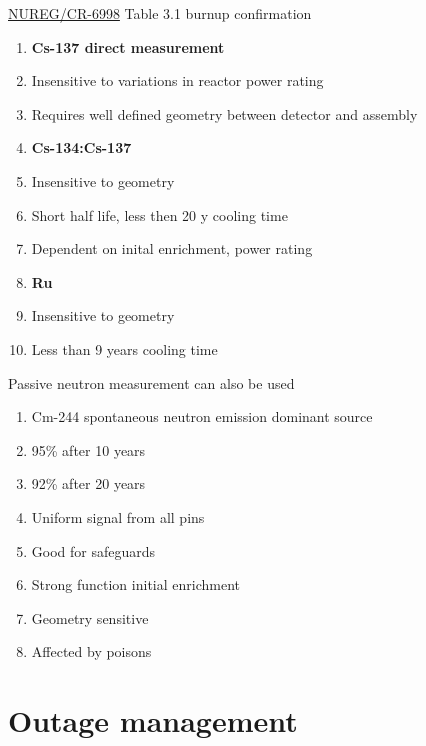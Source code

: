 \documentclass[aspectratio=1610,pdftex,dvipsnames,compress,xcolor={dvipsnames}]{beamer}
\begin{document}
\begin{frame}{\href{https://www.nrc.gov/docs/ML1002/ML100210543.pdf}{NUREG/CR-6998} Table 3.1 burnup confirmation}
    \begin{enumerate}[series=outerlist,topsep=0pt,itemsep=5pt,leftmargin=*,label=(\arabic*)]
        \item[]\textbf{Cs-137 direct measurement}
        \item[]Insensitive to variations in reactor power rating 
        \item[]Requires well defined geometry between detector and assembly
            \vspace{0.10in}
        \item[]\textbf{Cs-134:Cs-137}
        \item[]Insensitive to geometry
        \item[]Short half life, less then 20 y cooling time
        \item[]Dependent on inital enrichment, power rating
            \vspace{0.10in}
        \item[]\textbf{Ru}
        \item[]Insensitive to geometry
        \item[]Less than 9 years cooling time
    \end{enumerate}
\end{frame}


\begin{frame}{Passive neutron measurement can also be used}
    \begin{enumerate}[series=outerlist,topsep=0pt,itemsep=7pt,leftmargin=*,label=(\arabic*)]
        \item[]Cm-244 spontaneous neutron emission dominant source
        \item[]95\% after 10 years
        \item[]92\% after 20 years
        \item[]Uniform signal from all pins
        \item[]Good for safeguards
        \item[]Strong function initial enrichment
        \item[]Geometry sensitive
        \item[]Affected by poisons
    \end{enumerate}
\end{frame}


\section{Outage management}
\end{document}
